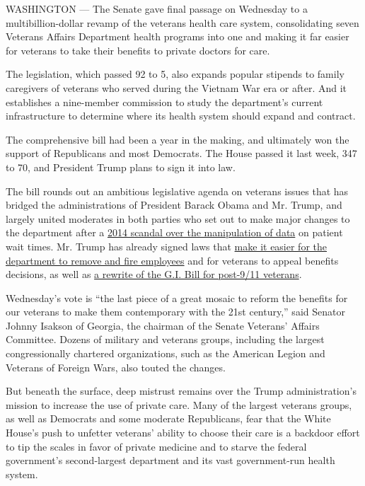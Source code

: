 WASHINGTON --- The Senate gave final passage on Wednesday to a
multibillion-dollar revamp of the veterans health care system,
consolidating seven Veterans Affairs Department health programs into one
and making it far easier for veterans to take their benefits to private
doctors for care.

The legislation, which passed 92 to 5, also expands popular stipends to
family caregivers of veterans who served during the Vietnam War era or
after. And it establishes a nine-member commission to study the
department's current infrastructure to determine where its health system
should expand and contract.

The comprehensive bill had been a year in the making, and ultimately won
the support of Republicans and most Democrats. The House passed it last
week, 347 to 70, and President Trump plans to sign it into law.

The bill rounds out an ambitious legislative agenda on veterans issues
that has bridged the administrations of President Barack Obama and Mr.
Trump, and largely united moderates in both parties who set out to make
major changes to the department after a
\href{https://www.nytimes3xbfgragh.onion/2014/05/29/us/va-report-confirms-improper-waiting-lists-at-phoenix-center.html}{2014
scandal over the manipulation of data} on patient wait times. Mr. Trump
has already signed laws that
\href{https://www.nytimes3xbfgragh.onion/2017/06/23/us/politics/trump-veterans-accountability-bill.html}{make
it easier for the department to remove and fire employees} and for
veterans to appeal benefits decisions, as well as
\href{https://www.nytimes3xbfgragh.onion/2017/08/02/us/politics/gi-bill-senate-expansion.html}{a
rewrite of the G.I. Bill for post-9/11 veterans}.

Wednesday's vote is ``the last piece of a great mosaic to reform the
benefits for our veterans to make them contemporary with the 21st
century,'' said Senator Johnny Isakson of Georgia, the chairman of the
Senate Veterans' Affairs Committee. Dozens of military and veterans
groups, including the largest congressionally chartered organizations,
such as the American Legion and Veterans of Foreign Wars, also touted
the changes.

But beneath the surface, deep mistrust remains over the Trump
administration's mission to increase the use of private care. Many of
the largest veterans groups, as well as Democrats and some moderate
Republicans, fear that the White House's push to unfetter veterans'
ability to choose their care is a backdoor effort to tip the scales in
favor of private medicine and to starve the federal government's
second-largest department and its vast government-run health system.

